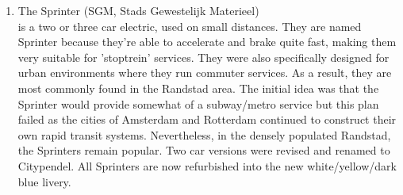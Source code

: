 \begin{appendices}
\begin{enumerate}
    \item The Sprinter (SGM, Stads Gewestelijk Materieel) \\ is a two or three car electric, used on small distances. They are named Sprinter because they're able to accelerate and brake quite fast, making them very suitable for 'stoptrein' services. They were also specifically designed for urban environments where they run commuter services. As a result, they are most commonly found in the Randstad area. The initial idea was that the Sprinter would provide somewhat of a subway/metro service but this plan failed as the cities of Amsterdam and Rotterdam continued to construct their own rapid transit systems. Nevertheless, in the densely populated Randstad, the Sprinters remain popular. Two car versions were revised and renamed to Citypendel. All Sprinters are now refurbished into the new white/yellow/dark blue livery.
\end{enumerate}
\end{appendices}